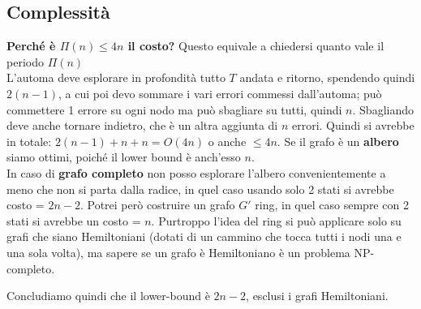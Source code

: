 \subsection{Complessità}
\textbf{Perché è $\Pi(n) \leq 4n$ il costo?} Questo equivale a chiedersi quanto
vale il periodo $\Pi(n)$\\

L'automa deve esplorare in profondità tutto $T$ andata e ritorno, spendendo quindi
$2(n-1)$, a cui poi devo sommare i vari errori commessi dall'automa; può
commettere 1 errore su ogni nodo ma può sbagliare su tutti, quindi $n$.
Sbagliando deve anche tornare indietro, che è un altra aggiunta di $n$ errori.
Quindi si avrebbe in totale: $2(n-1)+n+n = O(4n) $ o anche $\leq 4n$. Se il
grafo è un \textbf{albero} siamo ottimi, poiché il lower bound è anch'esso
$n$.\\
In caso di \textbf{grafo completo} non posso esplorare l'albero convenientemente
a meno che non si parta dalla radice, in quel caso usando solo 2 stati si
avrebbe costo = $2n-2$. Potrei però costruire un grafo $G'$ ring, in quel caso
sempre con 2 stati si avrebbe un costo = $n$. Purtroppo l'idea del ring si può
applicare solo su grafi che siano Hemiltoniani (dotati di un cammino che tocca
tutti i nodi una e una sola volta), ma sapere se un grafo è Hemiltoniano è un
problema NP-completo.

Concludiamo quindi che il lower-bound è $2n-2$, esclusi i grafi Hemiltoniani.

